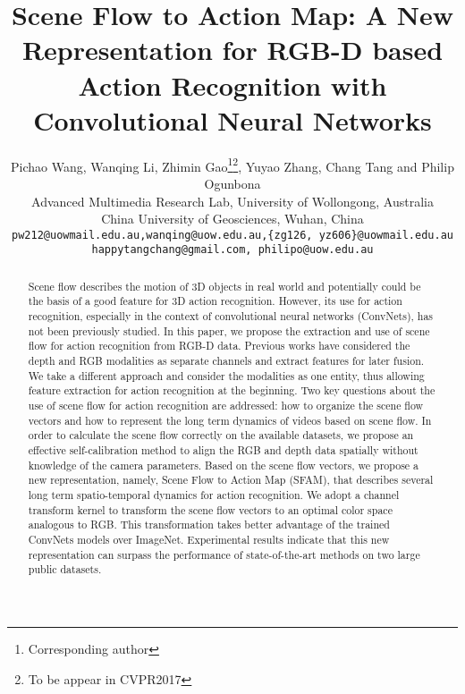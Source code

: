 \documentclass[10pt,twocolumn,letterpaper]{article}
\begin{document}
\title{Scene Flow to Action Map: A New Representation for RGB-D based\\ Action Recognition with Convolutional Neural Networks}

\author{Pichao Wang, Wanqing Li, Zhimin Gao\thanks{Corresponding author}\thanks{To be appear in CVPR2017}, Yuyao Zhang, Chang Tang and Philip Ogunbona\\
Advanced Multimedia Research Lab, University of Wollongong, Australia\\
China University of Geosciences, Wuhan, China\\
{\tt\small pw212@uowmail.edu.au,wanqing@uow.edu.au,\{zg126, yz606\}@uowmail.edu.au}\\ {\tt\small happytangchang@gmail.com, philipo@uow.edu.au}\\
}


\maketitle


\begin{abstract}
Scene flow describes the motion of 3D objects in 
real world and potentially could be the basis of a good feature for 3D action 
recognition. However, its use for action recognition, especially in the context 
of convolutional neural networks (ConvNets), has not been previously studied. 
In this paper, we propose the extraction and use of scene flow for action 
recognition from RGB-D data. Previous works have considered the depth and RGB 
modalities as separate channels and extract features for later fusion. 
We take a different approach and consider the modalities as one entity, thus 
allowing feature extraction for action recognition at the beginning.   
Two key questions about the use of scene flow for action recognition are 
addressed: how to organize the scene flow vectors and how to represent the long 
term dynamics of videos based on scene flow. In order to calculate the scene 
flow correctly on the available datasets, we propose an effective 
self-calibration method to align the RGB and depth data spatially without 
knowledge of the camera parameters. Based on the scene flow vectors, we propose 
a new representation, namely, Scene Flow to Action Map 
(SFAM), that describes several long term spatio-temporal dynamics for action 
recognition. We adopt a channel transform kernel to 
transform the scene flow vectors to an optimal color space analogous to RGB.  
This transformation takes better advantage of the trained ConvNets models over 
ImageNet. Experimental results indicate that this new representation can 
surpass the performance of state-of-the-art methods on two large 
public datasets.

\end{abstract}
\end{document}
